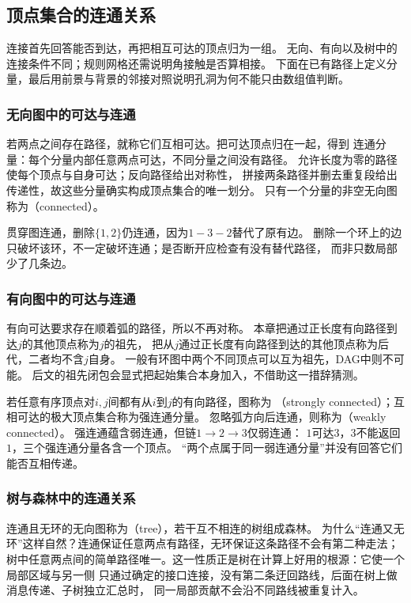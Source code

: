 \subsection{顶点集合的连通关系}

连接首先回答能否到达，再把相互可达的顶点归为一组。
无向、有向以及树中的连接条件不同；规则网格还需说明角接触是否算相接。
下面在已有路径上定义分量，最后用前景与背景的邻接对照说明孔洞为何不能只由数组值判断。

\subsubsection{无向图中的可达与连通}

若两点之间存在路径，就称它们互相可达。把可达顶点归在一起，得到
连通分量：每个分量内部任意两点可达，不同分量之间没有路径。
允许长度为零的路径使每个顶点与自身可达；反向路径给出对称性，
拼接两条路径并删去重复段给出传递性，故这些分量确实构成顶点集合的唯一划分。
只有一个分量的非空无向图称为（connected）。

贯穿图连通，删除\(\{1,2\}\)仍连通，因为\(1-3-2\)替代了原有边。
删除一个环上的边只破坏该环，不一定破坏连通；是否断开应检查有没有替代路径，
而非只数局部少了几条边。

\subsubsection{有向图中的可达与连通}

有向可达要求存在顺着弧的路径，所以不再对称。
本章把通过正长度有向路径到达\(j\)的其他顶点称为\(j\)的祖先，
把从\(j\)通过正长度有向路径到达的其他顶点称为后代，二者均不含\(j\)自身。
一般有环图中两个不同顶点可以互为祖先，DAG中则不可能。
后文的祖先闭包会显式把起始集合本身加入，不借助这一措辞猜测。

若任意有序顶点对\(i,j\)间都有从\(i\)到\(j\)的有向路径，图称为
（strongly connected）；互相可达的极大顶点集合称为强连通分量。
忽略弧方向后连通，则称为（weakly connected）。
强连通蕴含弱连通，但链\(1\to2\to3\)仅弱连通：
\(1\)可达\(3\)，\(3\)不能返回\(1\)，三个强连通分量各含一个顶点。
“两个点属于同一弱连通分量”并没有回答它们能否互相传递。

\subsubsection{树与森林中的连通关系}

连通且无环的无向图称为（tree），若干互不相连的树组成森林。
为什么“连通又无环”这样自然？连通保证任意两点有路径，无环保证这条路径不会有第二种走法；
树中任意两点间的简单路径唯一。这一性质正是树在计算上好用的根源：它使一个局部区域与另一侧
只通过确定的接口连接，没有第二条迂回路线，后面在树上做消息传递、子树独立汇总时，
同一局部贡献不会沿不同路线被重复计入。

